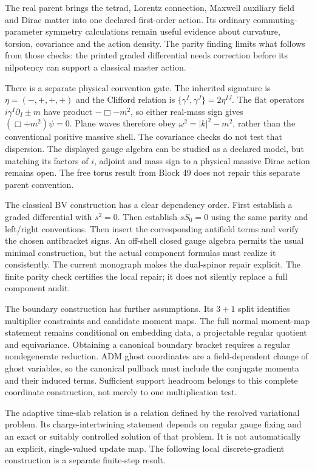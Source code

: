 The real parent brings the tetrad, Lorentz connection, Maxwell auxiliary field and Dirac matter into one declared first-order action. Its ordinary commuting-parameter symmetry calculations remain useful evidence about curvature, torsion, covariance and the action density. The parity finding limits what follows from those checks: the printed graded differential needs correction before its nilpotency can support a classical master action.

There is a separate physical convention gate. The inherited signature is \(\eta=(-,+,+,+)\) and the Clifford relation is \(\{\gamma^I,\gamma^J\}=2\eta^{IJ}\). The flat operators \(i\gamma^I\partial_I\pm m\) have product \(-\Box-m^2\), so either real-mass sign gives \((\Box+m^2)\psi=0\). Plane waves therefore obey \(\omega^2=|k|^2-m^2\), rather than the conventional positive massive shell. The covariance checks do not test that dispersion. The displayed gauge algebra can be studied as a declared model, but matching its factors of \(i\), adjoint and mass sign to a physical massive Dirac action remains open. The free torus result from Block 49 does not repair this separate parent convention.

The classical BV construction has a clear dependency order. First establish a graded differential with \(s^2=0\). Then establish \(sS_0=0\) using the same parity and left/right conventions. Then insert the corresponding antifield terms and verify the chosen antibracket signs. An off-shell closed gauge algebra permits the usual minimal construction, but the actual component formulas must realize it consistently. The current monograph makes the dual-spinor repair explicit. The finite parity check certifies the local repair; it does not silently replace a full component audit.

The boundary construction has further assumptions. Its \(3+1\) split identifies multiplier constraints and candidate moment maps. The full normal moment-map statement remains conditional on embedding data, a projectable regular quotient and equivariance. Obtaining a canonical boundary bracket requires a regular nondegenerate reduction. ADM ghost coordinates are a field-dependent change of ghost variables, so the canonical pullback must include the conjugate momenta and their induced terms. Sufficient support headroom belongs to this complete coordinate construction, not merely to one multiplication test.

The adaptive time-slab relation is a relation defined by the resolved variational problem. Its charge-intertwining statement depends on regular gauge fixing and an exact or suitably controlled solution of that problem. It is not automatically an explicit, single-valued update map. The following local discrete-gradient construction is a separate finite-step result.

